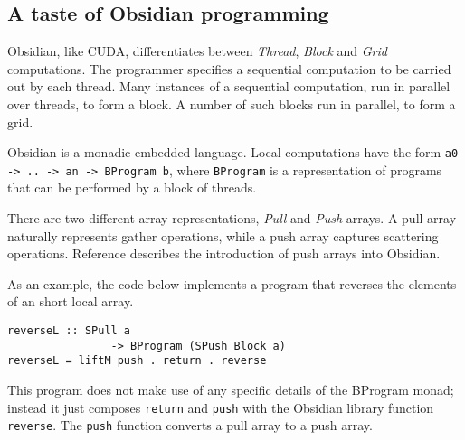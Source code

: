
\subsection{A taste of Obsidian programming}

Obsidian, like CUDA, differentiates between {\em Thread}, {\em Block} and 
{\em Grid} computations. The programmer specifies a sequential computation 
to be carried out by each thread. Many instances of a sequential computation,  
run in parallel over threads, to form a block. A number of such blocks run in 
parallel, to form a grid. 

Obsidian is a monadic embedded language. Local computations have the form 
{\tt a0 -> .. -> an -> BProgram b}, where {\tt BProgram}
is a representation of programs that can be performed by a block of threads.

There are two different array representations, {\em Pull} and 
{\em Push} arrays. A pull array naturally represents gather operations,
while a push array captures scattering operations. Reference \cite{Obsidian-Expressive} 
describes the introduction of push arrays into Obsidian.  

As an example, the code below implements a program that reverses the elements 
of an short local array. 


\begin{small}
\begin{verbatim}
reverseL :: SPull a
                -> BProgram (SPush Block a)
reverseL = liftM push . return . reverse 
\end{verbatim} 
\end{small} 


This program does not make use of any specific details of the BProgram monad; 
instead it just composes {\tt return} and {\tt push} with the Obsidian library 
function {\tt reverse}. The {\tt push} function converts a pull array to a push 
array.

